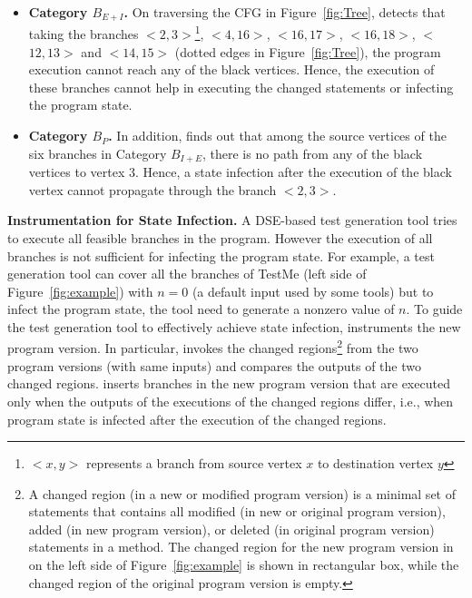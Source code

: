 \begin{itemize}
\vspace{-1ex}
\item \textbf{Category $B_{E+I}$.} On traversing the CFG in Figure~\ref{fig:Tree},  detects that taking the branches $<$$2, 3$$>$\footnote{\scriptsize{$<$$x,y$$>$ represents a branch from source vertex $x$ to destination vertex $y$}}, $<$$4, 16$$>$, $<$$16, 17$$>$, $<$$16, 18$$>$, $<$$12, 13$$>$ and $<$$14, 15$$>$ (dotted edges in Figure~\ref{fig:Tree}), the program execution cannot reach any of the black vertices. Hence, the execution of these branches cannot help in executing the changed statements or infecting the program state. \\ 
\vspace{-1ex} 
\item \textbf{Category $B_{P}$.} In addition,  finds out that 
among the source vertices of the six branches in Category $B_{I+E}$, there is no path from any of the 
black vertices to vertex 3. Hence, a state infection after the execution of the black vertex 
cannot propagate through the branch $<2,3>$.
\end{itemize}
\vspace{-0.2cm}
\textbf{Instrumentation for State Infection.}
A DSE-based test generation tool tries to execute all feasible branches in the program. However the execution of 
all branches is not sufficient for infecting the program state. For example, 
a test generation tool can 
cover all the branches of \CodeIn{}TestMe (left side of Figure~\ref{fig:example}) with $n=0$ (a default input used by some tools) but to infect the program state, the tool
need to generate a nonzero value of $n$.
To guide the test generation tool to effectively achieve state infection,
 instruments the new program version.
In particular,  invokes the changed regions\footnote{\scriptsize{A changed region (in a new or modified program version) is a minimal set of statements that contains all modified (in new or original program version), added (in new program version), or deleted (in original program version) statements in a method. The changed region for the new program version in  on the left side of Figure~\ref{fig:example} is shown in rectangular box, while the changed region of the original program version is empty.}} 
from the two program versions (with same inputs) and 
compares the outputs of the two changed regions. 
 inserts branches in the new program version that are executed only 
when the outputs of the executions of the changed regions differ, i.e., when program
state is infected after the execution of the changed regions.

